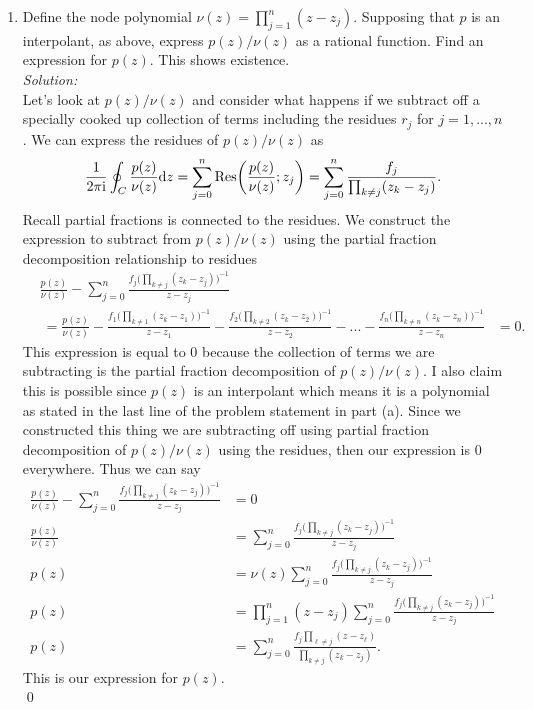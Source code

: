 \documentclass[10pt]{amsart}
\newcommand{\D}{\mathrm{d}}
\newcommand{\I}{\mathrm{i}}
\theoremstyle{nonumberplain}
\begin{document}
\begin{enumerate}[label={\bf {\arabic*}:}]
\begin{enumerate}
\newpage

\item Define the node polynomial $\nu(z) = \prod_{j=1}^n( z - z_j)$.
Supposing that $p$ is an interpolant, as above, express $p(z)/\nu(z)$ as a rational function. 
Find an expression for $p(z)$. This shows existence.\\

\noindent
\textit{Solution:} \\
Let's look at $p(z)/\nu(z)$ and consider what happens if we subtract off a specially cooked up collection of terms including the residues $r_j$ for $j=1, ..., n$.
We can express the residues of $p(z)/\nu(z)$ as
$$
\frac 1 {2 \pi \I} \oint_C \frac {p(z)}{\nu(z)} \D z
	= \sum_{j = 0}^n {\rm Res}\bigg(\frac {p(z)}{\nu(z)}; z_j\bigg)
	= \sum_{j = 0}^n \frac {f_j} {\prod_{k \neq j}( z _k - z_j )}.
$$
Recall partial fractions is connected to the residues.
We construct the expression to subtract from $p(z)/\nu(z)$ using the partial fraction decomposition relationship to residues
\begin{align*}
& \frac {p(z)}{\nu(z)} - \sum_{j = 0}^n \frac {f_j \Big(\prod_{k \neq j}( z _k - z_j )\Big)^{-1}} {z - z_j} \\
	&\: = \frac {p(z)}{\nu(z)}
		- \frac {f_1 \Big(\prod_{k \neq 1}( z _k - z_1 )\Big)^{-1}}{z - z_1}
		- \frac {f_2 \Big(\prod_{k \neq 2}( z _k - z_2 )\Big)^{-1}}{z - z_2} 
		- ...
		- \frac {f_n \Big(\prod_{k \neq n}( z _k - z_n )\Big)^{-1}}{z - z_n}
	&= 0.
\end{align*}
This expression is equal to 0 because the collection of terms we are subtracting is the partial fraction decomposition of $p(z)/\nu(z)$.
I also claim this is possible since $p(z)$ is an interpolant which means it is a polynomial as stated in the last line of the problem statement in part (a).
Since we constructed this thing we are subtracting off using partial fraction decomposition of $p(z)/\nu(z)$ using the residues, then our expression is 0 everywhere.
Thus we can say
\begin{align*}
\frac {p(z)}{\nu(z)} - \sum_{j = 0}^n \frac {f_j \Big(\prod_{k \neq j}( z _k - z_j )\Big)^{-1}} {z - z_j} &= 0 \\
\frac {p(z)}{\nu(z)} &= \sum_{j = 0}^n \frac {f_j \Big(\prod_{k \neq j}( z _k - z_j )\Big)^{-1}} {z - z_j} \\
p(z) &= \nu(z)\sum_{j = 0}^n \frac {f_j \Big(\prod_{k \neq j}( z _k - z_j )\Big)^{-1}} {z - z_j} \\
p(z) &= \prod_{j=1}^n( z - z_j)\sum_{j = 0}^n \frac {f_j \Big(\prod_{k \neq j}( z _k - z_j )\Big)^{-1}} {z - z_j} \\
p(z) &= \sum_{j = 0}^n \frac {f_j \prod_{\ell \neq j}( z - z_\ell) } {\prod_{k \neq j}( z _k - z_j )}.
\end{align*}
This is our expression for $p(z)$. \\
\qed \\
\end{enumerate}


\end{enumerate}
\end{document}
